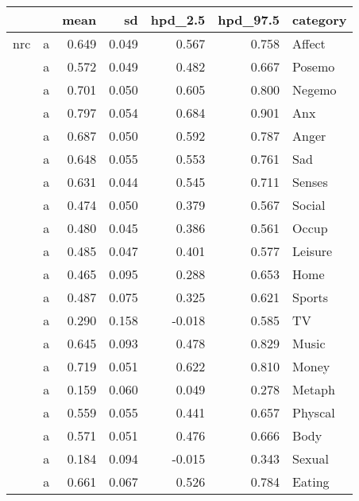 \documentclass[11pt,a4paper]{article}
\begin{document}
\tiny
\begin{longtable}{llrrrrl}

\toprule
   &    &   mean &     sd &  hpd\_2.5 &  hpd\_97.5 &        category \\
\midrule
nrc & a &  0.649 &  0.049 &    0.567 &     0.758 &          Affect \\
   & a &  0.572 &  0.049 &    0.482 &     0.667 &          Posemo \\
   & a &  0.701 &  0.050 &    0.605 &     0.800 &          Negemo \\
   & a &  0.797 &  0.054 &    0.684 &     0.901 &             Anx \\
   & a &  0.687 &  0.050 &    0.592 &     0.787 &           Anger \\
   & a &  0.648 &  0.055 &    0.553 &     0.761 &             Sad \\
   & a &  0.631 &  0.044 &    0.545 &     0.711 &          Senses \\
   & a &  0.474 &  0.050 &    0.379 &     0.567 &          Social \\
   & a &  0.480 &  0.045 &    0.386 &     0.561 &           Occup \\
   & a &  0.485 &  0.047 &    0.401 &     0.577 &         Leisure \\
   & a &  0.465 &  0.095 &    0.288 &     0.653 &            Home \\
   & a &  0.487 &  0.075 &    0.325 &     0.621 &          Sports \\
   & a &  0.290 &  0.158 &   -0.018 &     0.585 &              TV \\
   & a &  0.645 &  0.093 &    0.478 &     0.829 &           Music \\
   & a &  0.719 &  0.051 &    0.622 &     0.810 &           Money \\
   & a &  0.159 &  0.060 &    0.049 &     0.278 &          Metaph \\
   & a &  0.559 &  0.055 &    0.441 &     0.657 &         Physcal \\
   & a &  0.571 &  0.051 &    0.476 &     0.666 &            Body \\
   & a &  0.184 &  0.094 &   -0.015 &     0.343 &          Sexual \\
   & a &  0.661 &  0.067 &    0.526 &     0.784 &          Eating \\

\end{longtable}
\end{document}
